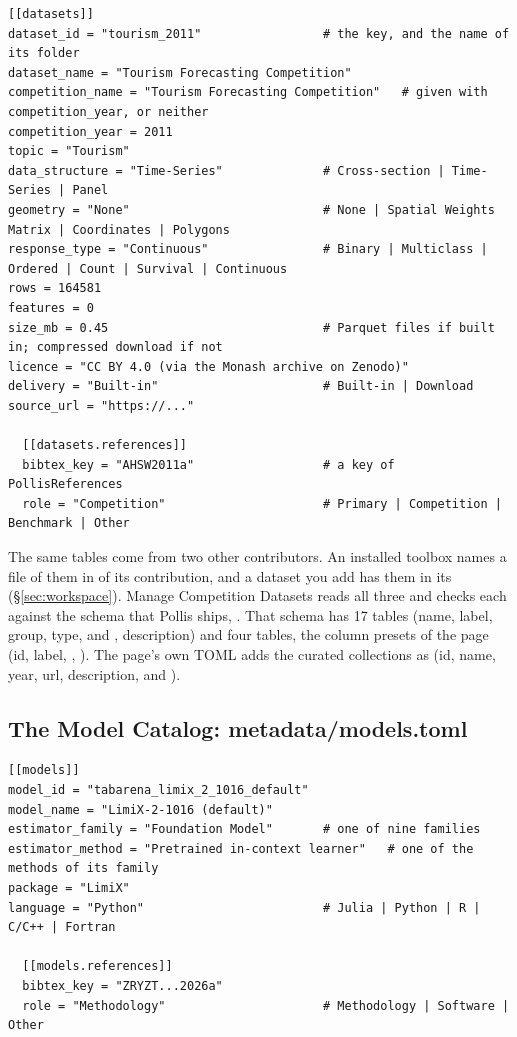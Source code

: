 \begin{lstlisting}
[[datasets]]
dataset_id = "tourism_2011"                 # the key, and the name of its folder
dataset_name = "Tourism Forecasting Competition"
competition_name = "Tourism Forecasting Competition"   # given with competition_year, or neither
competition_year = 2011
topic = "Tourism"
data_structure = "Time-Series"              # Cross-section | Time-Series | Panel
geometry = "None"                           # None | Spatial Weights Matrix | Coordinates | Polygons
response_type = "Continuous"                # Binary | Multiclass | Ordered | Count | Survival | Continuous
rows = 164581
features = 0
size_mb = 0.45                              # Parquet files if built in; compressed download if not
licence = "CC BY 4.0 (via the Monash archive on Zenodo)"
delivery = "Built-in"                       # Built-in | Download
source_url = "https://..."

  [[datasets.references]]
  bibtex_key = "AHSW2011a"                  # a key of PollisReferences
  role = "Competition"                      # Primary | Competition | Benchmark | Other
\end{lstlisting}

The same \file{[[datasets]]} tables come from two other contributors. An installed toolbox names a file of them in
 of its  contribution, and a dataset you add has them in its
 (\S\ref{sec:workspace}). Manage Competition Datasets reads all three and checks each against the
schema that Pollis ships, . That schema has 17
\file{[[field]]} tables (name, label, group, type,  and , description) and four
\file{[[view]]} tables, the column presets of the page (id, label, , ). The page's own TOML
adds the curated collections as \file{[[collections]]} (id, name, year, url, description,  and
).

\subsection{The Model Catalog: metadata/models.toml}

\begin{lstlisting}
[[models]]
model_id = "tabarena_limix_2_1016_default"
model_name = "LimiX-2-1016 (default)"
estimator_family = "Foundation Model"       # one of nine families
estimator_method = "Pretrained in-context learner"   # one of the methods of its family
package = "LimiX"
language = "Python"                         # Julia | Python | R | C/C++ | Fortran

  [[models.references]]
  bibtex_key = "ZRYZT...2026a"
  role = "Methodology"                      # Methodology | Software | Other
\end{lstlisting}

